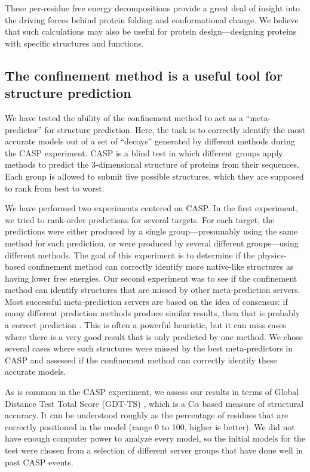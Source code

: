 \documentclass[12pt]{article}
\begin{document}
These per-residue free energy decompositions provide a great deal of insight into the driving forces behind protein
folding and conformational change. We believe that such calculations may also be useful for protein design---designing
proteins with specific structures and functions.

\subsection*{The confinement method is a useful tool for structure prediction}

We have tested the ability of the confinement method to act as a ``meta-predictor'' for structure prediction. Here, the
task is to correctly identify the most accurate models out of a set of ``decoys'' generated by different methods during
the CASP experiment. CASP is a blind test in which different groups apply methods to predict the 3-dimensional structure
of proteins from their sequences. Each group is allowed to submit five possible structures, which they are supposed to
rank from best to worst.

We have performed two experiments centered on CASP. In the first experiment, we tried to rank-order predictions for
several targets. For each target, the predictions were either produced by a single group---presumably using the same
method for each prediction, or were produced by several different groups---using different methods. The goal of this
experiment is to determine if the physics-based confinement method can correctly identify more native-like structures as
having lower free energies. Our second experiment was to see if the confinement method can identify structures that are
missed by other meta-prediction servers. Most successful meta-prediction servers are based on the idea of consensus: if
many different prediction methods produce similar results, then that is probably a correct prediction \cite{Kryshtafovych2011,Wang2011}. This is
often a powerful heuristic, but it can miss cases where there is a very good result that is only predicted by one
method. We chose several cases where such structures were missed by the best meta-predictors in CASP and assessed if the
confinement method can correctly identify these accurate models.

As is common in the CASP experiment, we assess our results in terms of Global Distance Test Total Score (GDT-TS)
\cite{Zemla2003}, which is a C$\alpha$ based measure of structural accuracy. It can be understood roughly as the
percentage of residues that are correctly positioned in the model (range 0 to 100, higher is
better). We did not have enough
computer power to analyze every model, so the initial models for the test were chosen from a selection of different
server groups that have done well in past CASP events.
\end{document}
